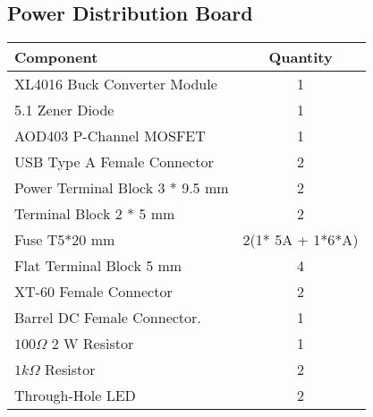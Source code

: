 \subsection{Power Distribution Board}
\begin{center}
	\setlength\extrarowheight{7pt}
	\begin{tabular}{lc}
		{\large Component} & {\large Quantity} \\\midrule
		{\large XL4016 Buck Converter Module} & {\large 1} \\
		{\large 5.1 Zener Diode} & {\large 1} \\
		{\large AOD403 P-Channel MOSFET} & {\large 1}\\
		{\large USB Type A Female Connector} & {\large 2} \\
		{\large Power Terminal Block 3 * 9.5 mm} & {\large 2} \\ 
		{\large Terminal Block 2 * 5 mm} & {\large 2} \\
		{\large Fuse T5*20 mm} & {\large 2(1* 5A + 1*6*A)} \\
		{\large Flat Terminal Block 5 mm} & {\large 4} \\
		{\large XT-60 Female Connector} & {\large 2} \\        {\large Barrel DC Female Connector. } & {\large 1} \\
		{\large $100 \Omega$ 2 W Resistor } & {\large 1} \\
		{\large $1 k\Omega$ Resistor} & {\large 2} \\
		{\large Through-Hole LED} & {\large 2} \\
		
	\end{tabular}
\end{center}



\newpage



